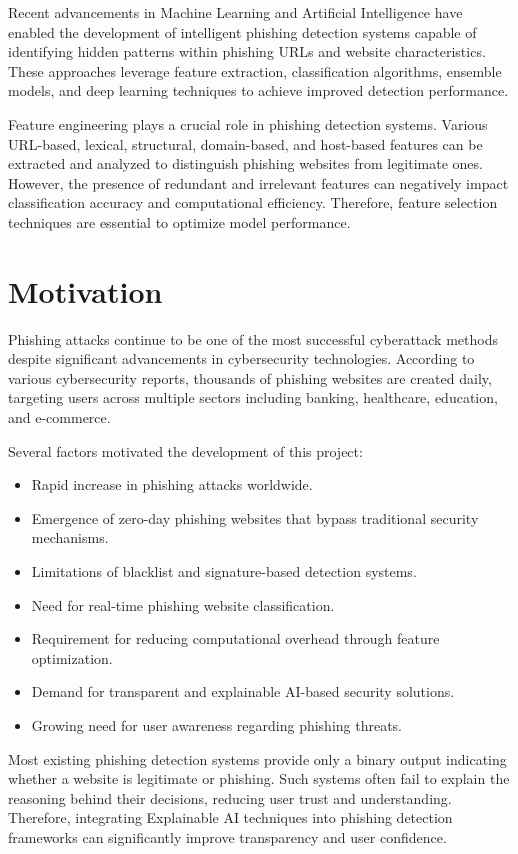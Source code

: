 \documentclass[12pt]{report}
\begin{document}
Recent advancements in Machine Learning and Artificial Intelligence have enabled the development of intelligent phishing detection systems capable of identifying hidden patterns within phishing URLs and website characteristics. These approaches leverage feature extraction, classification algorithms, ensemble models, and deep learning techniques to achieve improved detection performance.

Feature engineering plays a crucial role in phishing detection systems. Various URL-based, lexical, structural, domain-based, and host-based features can be extracted and analyzed to distinguish phishing websites from legitimate ones. However, the presence of redundant and irrelevant features can negatively impact classification accuracy and computational efficiency. Therefore, feature selection techniques are essential to optimize model performance.

\section{Motivation}

Phishing attacks continue to be one of the most successful cyberattack methods despite significant advancements in cybersecurity technologies. According to various cybersecurity reports, thousands of phishing websites are created daily, targeting users across multiple sectors including banking, healthcare, education, and e-commerce.

Several factors motivated the development of this project:

\begin{itemize}
    \item Rapid increase in phishing attacks worldwide.
    \item Emergence of zero-day phishing websites that bypass traditional security mechanisms.
    \item Limitations of blacklist and signature-based detection systems.
    \item Need for real-time phishing website classification.
    \item Requirement for reducing computational overhead through feature optimization.
    \item Demand for transparent and explainable AI-based security solutions.
    \item Growing need for user awareness regarding phishing threats.
\end{itemize}

Most existing phishing detection systems provide only a binary output indicating whether a website is legitimate or phishing. Such systems often fail to explain the reasoning behind their decisions, reducing user trust and understanding. Therefore, integrating Explainable AI techniques into phishing detection frameworks can significantly improve transparency and user confidence.
\end{document}
